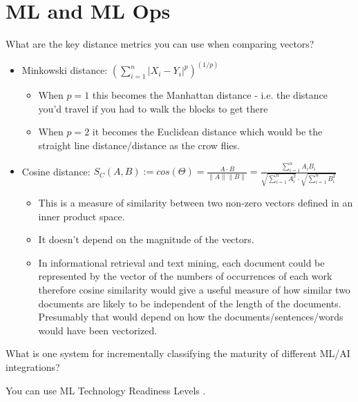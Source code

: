 \section{ML and ML Ops}
\begin{questions}
\question What are the key distance metrics you can use when comparing vectors?
\begin{solution}
\begin{itemize}
    \item Minkowski distance: $( \sum^n_{i=1} |X_i - Y_i |^p )^{(1/p)}$
    \begin{itemize}
        \item When $p=1$ this becomes the Manhattan distance - i.e. the distance you'd travel if you had to walk the blocks to get there
        \item When $p=2$ it becomes the Euclidean distance which would be the straight line distance/distance as the crow flies.
    \end{itemize}
    \item Cosine distance: $S_C(A, B):= cos(\Theta) = \frac{A \cdot B}{\|A\| \|B\| } = \frac{\sum^n_{i=1} A_i B_i}{\sqrt{\sum^n_{i=1}A^{2}_i} \cdot \sqrt{\sum^n_{i=1}B^{2}_i}}$
    \begin{itemize}
        \item This is a measure of similarity between two non-zero vectors defined in an inner product space.
        \item It doesn't depend on the magnitude of the vectors.
        \item In informational retrieval and text mining, each document could be represented by the vector of the numbers of occurrences of each work therefore cosine similarity would give a useful measure of how similar two documents are likely to be independent of the length of the documents. Presumably that would depend on how the documents/sentences/words would have been vectorized.
    \end{itemize}
\end{itemize}
\end{solution}

\question What is one system for incrementally classifying the maturity of different ML/AI integrations?
\begin{solution}
    \item You can use ML Technology Readiness Levels \cite{natureTechnologyReadiness}.
\end{solution}
\end{questions}

